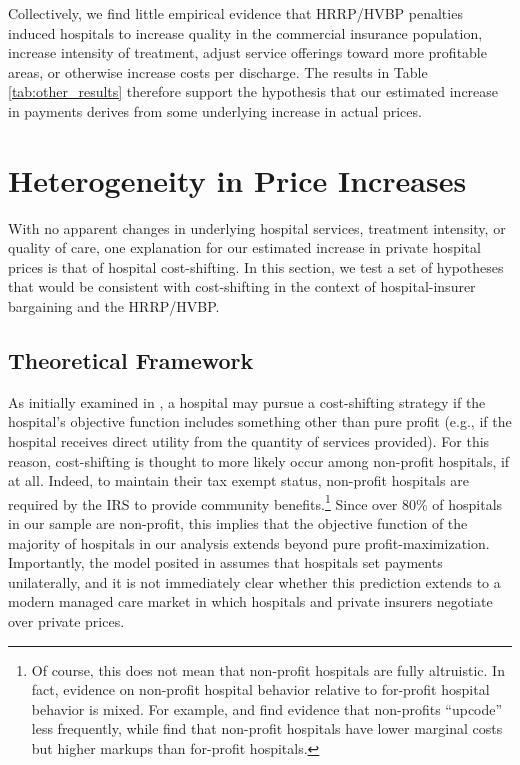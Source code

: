 \documentclass[12pt]{article}
\begin{document}
Collectively, we find little empirical evidence that HRRP/HVBP penalties induced hospitals to increase quality in the commercial insurance population, increase intensity of treatment, adjust service offerings toward more profitable areas, or otherwise increase costs per discharge. The results in Table \ref{tab:other_results} therefore support the hypothesis that our estimated increase in payments derives from some underlying increase in actual prices.

\section{Heterogeneity in Price Increases}
\label{sec:Ext}
With no apparent changes in underlying hospital services, treatment intensity, or quality of care, one explanation for our estimated increase in private hospital prices is that of hospital cost-shifting. In this section, we test a set of hypotheses that would be consistent with cost-shifting in the context of hospital-insurer bargaining and the HRRP/HVBP.

\subsection{Theoretical Framework}
As initially examined in \cite{dranove1988}, a hospital may pursue a cost-shifting strategy if the hospital's objective function includes something other than pure profit (e.g., if the hospital receives direct utility from the quantity of services provided). For this reason, cost-shifting is thought to more likely occur among non-profit hospitals, if at all. Indeed, to maintain their tax exempt status, non-profit hospitals are required by the IRS to provide community benefits.\footnote{Of course, this does not mean that non-profit hospitals are fully altruistic. In fact, evidence on non-profit hospital behavior relative to for-profit hospital behavior is mixed. For example, \cite{silverman2004} and \cite{dafny2005} find evidence that non-profits ``upcode'' less frequently, while \cite{gaynor2003} find that non-profit hospitals have lower marginal costs but higher markups than for-profit hospitals.} Since over 80\% of hospitals in our sample are non-profit, this implies that the objective function of the majority of hospitals in our analysis extends beyond pure profit-maximization.  Importantly, the model posited in \cite{dranove1988} assumes that hospitals set payments unilaterally, and it is not immediately clear whether this prediction extends to a modern managed care market in which hospitals and private insurers negotiate over private prices.
\end{document}
